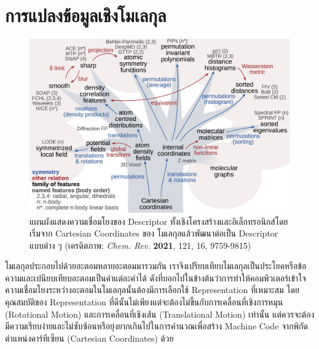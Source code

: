 \section{การแปลงข้อมูลเชิงโมเลกุล}
\label{sec:mol_transform}

\begin{figure}[htbp]
    \centering
    \includegraphics[width=\linewidth]{fig/qm_descriptors_map.jpeg}
    \caption{แผนผังแสดงความเชื่อมโยงของ Descriptor ทั้งเชิงโครงสร้างและอิเล็กทรอนิกส์โดยเริ่มจาก Cartesian Coordinates ของ%
        โมเลกุลแล้วพัฒนาต่อเป็น Descriptor แบบต่าง ๆ
        (เครดิตภาพ: \textit{Chem. Rev.} \textbf{2021}, 121, 16, 9759-9815\autocite{musil2021})}
    \label{fig:qm_descriptor_map}
\end{figure}

โมเลกุลประกอบไปด้วยอะตอมหลายอะตอมมารวมกัน เราจึงเปรียบเทียบโมเลกุลเป็นประโยคหรือข้อความและเปนียบเทียบอะตอมเป็นคำแต่ละคำได้
ดังที่บอกไปในข้างต้นว่าการทำให้คอมพิวเตอร์เข้าใจความเชื่อมโยงระหว่างอะตอมในโมเลกุลนั้นต้องมีการเลือกใช้ Representation ที่เหมาะสม
โดยคุณสมบัติของ Representation ที่ดีนั้นไม่เพียงแต่จะต้องไม่ขึ้นกับการเคลื่อนที่เชิงการหมุน (Rotational Motion) และการเคลื่อนที่เชิงเส้น
(Translational Motion) เท่านั้น แต่ควรจะต้องมีความเรียบง่ายและไม่ซับซ้อนหรือยุ่งยากเกินไปในการคำนวณเพื่อสร้าง Machine Code
จากพิกัดตำแหน่งคาร์ทีเซียน (Cartesian Coordinates) ด้วย

